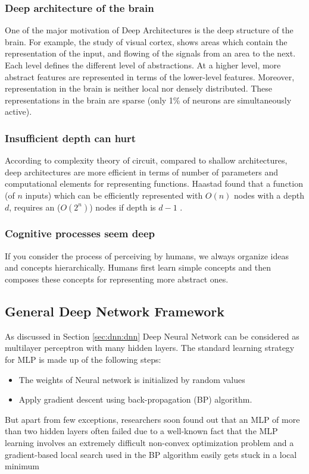 \subsubsection{Deep architecture of the brain}
One of the major motivation of Deep Architectures is the deep structure of the brain. For example, the study of visual cortex, shows areas which contain the representation of the input, and flowing of the signals from an area to the next. Each level defines the different level of abstractions. At a higher level, more abstract features are represented in terms of the lower-level features. Moreover, representation in the brain is neither local nor densely distributed. These representations in the brain are sparse (only 1\% of neurons are simultaneously active).

\subsubsection{Insufficient depth can hurt}
According to complexity theory of circuit, compared to shallow architectures, deep architectures are more efficient in terms of number of parameters and computational elements for representing functions\citep{bengio2007scaling}. Haastad found that a function (of $n$ inputs) which can be efficiently represented with $O(n)$ nodes with a depth $d$, requires an ($O(2^n)$) nodes if depth is $d-1$ \citep{bengio2007greedy}.

\subsubsection{Cognitive processes seem deep}
If you consider the process of perceiving by humans, we always organize ideas and concepts hierarchically. Humans first learn simple concepts and then composes these concepts for representing more abstract ones. 

\subsection{General Deep Network Framework}
As discussed in Section \ref{sec:dnn:dnn} Deep Neural Network can be considered as multilayer perceptron with many hidden layers. The standard learning strategy for MLP is made up of the following steps:\\
\begin{itemize}
\item The weights of Neural network is initialized by random values
\item Apply gradient descent using back-propagation (BP) algorithm.
\end{itemize}
But apart from few exceptions, researchers soon found out that an MLP of more than two hidden layers often failed \cite{bengio2007greedy} due to a well-known fact that the MLP learning involves an extremely difficult non-convex optimization problem and a gradient-based local search used in
the BP algorithm easily gets stuck in a local minimum 

